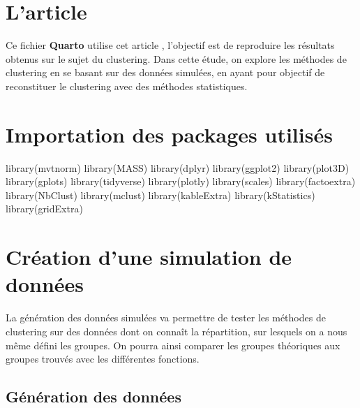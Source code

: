 \documentclass{article}
\newenvironment{Shaded}{\begin{snugshade}}{\end{snugshade}}
\newcommand{\FunctionTok}[1]{\textcolor[rgb]{0.28,0.35,0.67}{#1}}
\newcommand{\NormalTok}[1]{\textcolor[rgb]{0.00,0.23,0.31}{#1}}
\begin{document}
\setcounter{page}{1}
\pagestyle{fancy}

\section{L'article}\label{larticle}

Ce fichier \textbf{Quarto} utilise cet article
\textcite{clusterAnalysis}, l'objectif est de reproduire les résultats
obtenus sur le sujet du clustering. Dans cette étude, on explore les
méthodes de clustering en se basant sur des données simulées, en ayant
pour objectif de reconstituer le clustering avec des méthodes
statistiques.

\section{Importation des packages
utilisés}\label{importation-des-packages-utilisuxe9s}

\begin{Shaded}
\begin{Highlighting}[]
\FunctionTok{library}\NormalTok{(mvtnorm)}
\FunctionTok{library}\NormalTok{(MASS)}
\FunctionTok{library}\NormalTok{(dplyr)}
\FunctionTok{library}\NormalTok{(ggplot2)}
\FunctionTok{library}\NormalTok{(plot3D)}
\FunctionTok{library}\NormalTok{(gplots)}
\FunctionTok{library}\NormalTok{(tidyverse)}
\FunctionTok{library}\NormalTok{(plotly)}
\FunctionTok{library}\NormalTok{(scales)}
\FunctionTok{library}\NormalTok{(factoextra)}
\FunctionTok{library}\NormalTok{(NbClust)}
\FunctionTok{library}\NormalTok{(mclust)}
\FunctionTok{library}\NormalTok{(kableExtra)}
\FunctionTok{library}\NormalTok{(kStatistics)}
\FunctionTok{library}\NormalTok{(gridExtra)}
\end{Highlighting}
\end{Shaded}

\section{Création d'une simulation de
données}\label{cruxe9ation-dune-simulation-de-donnuxe9es}

La génération des données simulées va permettre de tester les méthodes
de clustering sur des données dont on connaît la répartition, sur
lesquels on a nous même défini les groupes. On pourra ainsi comparer les
groupes théoriques aux groupes trouvés avec les différentes fonctions.

\subsection{Génération des
données}\label{guxe9nuxe9ration-des-donnuxe9es}
\end{document}
